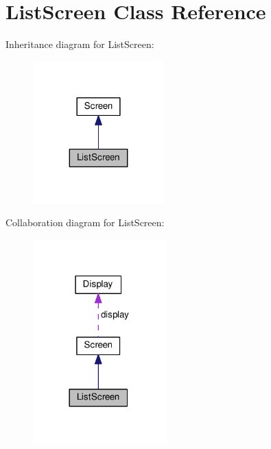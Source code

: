 \hypertarget{classListScreen}{}\section{List\+Screen Class Reference}
\label{classListScreen}


Inheritance diagram for List\+Screen\+:\nopagebreak
\begin{figure}[H]
\begin{center}
\leavevmode
\includegraphics[width=143pt]{classListScreen__inherit__graph}
\end{center}
\end{figure}


Collaboration diagram for List\+Screen\+:\nopagebreak
\begin{figure}[H]
\begin{center}
\leavevmode
\includegraphics[width=146pt]{classListScreen__coll__graph}
\end{center}
\end{figure}

